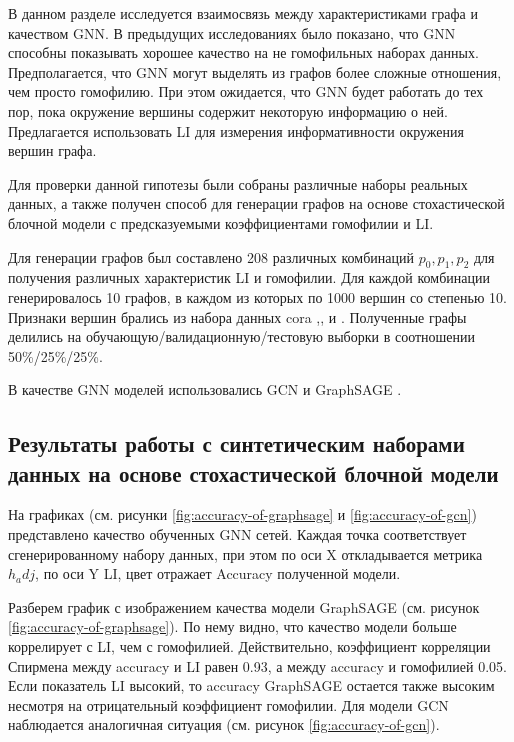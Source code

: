 \documentclass[a4paper,14pt]{article}
\begin{document}
	В данном разделе исследуется взаимосвязь между характеристиками графа и качеством GNN.
	В предыдущих исследованиях было показано, что GNN способны показывать хорошее качество на не гомофильных наборах данных.
	Предполагается, что GNN могут выделять из графов более сложные отношения, чем просто гомофилию.
	При этом ожидается, что GNN будет работать до тех пор, пока окружение вершины содержит некоторую информацию о ней.
	Предлагается использовать LI для измерения информативности окружения вершин графа.
	
	Для проверки данной гипотезы были собраны различные наборы реальных данных, а также получен способ для генерации графов на основе стохастической блочной модели с предсказуемыми коэффициентами гомофилии и LI.
	
	Для генерации графов был составлено 208 различных комбинаций $p_0,p_1,p_2$ для получения различных характеристик LI и гомофилии.
	Для каждой комбинации генерировалось 10 графов, в каждом из которых по 1000 вершин со степенью 10.
	Признаки вершин брались из набора данных cora \cite{mccallum2000automating},\cite{namata2012query},\cite{sen2008collective} и \cite{yang2016revisiting}.
	Полученные графы делились на обучающую/валидационную/тестовую выборки в соотношении 50\%/25\%/25\%.
	
	В качестве GNN моделей использовались GCN \cite{kipf2016semi} и GraphSAGE \cite{hamilton2017inductive}.
	
	\subsection{Результаты работы с синтетическим наборами данных на основе стохастической блочной модели}

	На графиках (см. рисунки \ref{fig:accuracy-of-graphsage} и \ref{fig:accuracy-of-gcn}) представлено качество обученных GNN сетей.
	Каждая точка соответствует сгенерированному набору данных, при этом по оси X откладывается метрика $h_adj$, по оси Y LI, цвет отражает Accuracy полученной модели. 
	
	Разберем график с изображением качества модели GraphSAGE (см. рисунок \ref{fig:accuracy-of-graphsage}).
	По нему видно, что качество модели больше коррелирует с LI, чем с гомофилией.
	Действительно, коэффициент корреляции Спирмена между accuracy и LI равен 0.93, а между accuracy и гомофилией 0.05.
	Если показатель LI высокий, то accuracy GraphSAGE остается также высоким несмотря на отрицательный коэффициент гомофилии.
	Для модели GCN наблюдается аналогичная ситуация (см. рисунок \ref{fig:accuracy-of-gcn}).
\end{document}
